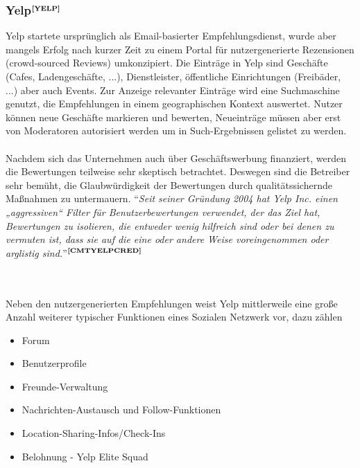 \subsubsection[Yelp]{Yelp$^{\textbf{\ref{YELP}}}$}%
\addtocounter{footnote}{1}
Yelp startete ursprünglich als Email-basierter Empfehlungsdienst, wurde aber mangels Erfolg nach kurzer Zeit zu einem Portal für nutzergenerierte Rezensionen (crowd-sourced Reviews) umkonzipiert.
Die Einträge in Yelp sind Geschäfte (Cafes, Ladengeschäfte, ...), Dienstleister, öffentliche Einrichtungen (Freibäder, ...) aber auch Events. Zur Anzeige relevanter Einträge wird eine Suchmaschine genutzt, die Empfehlungen in einem geographischen Kontext auswertet. Nutzer können neue Geschäfte markieren und bewerten, Neueinträge müssen aber erst von Moderatoren autorisiert werden um in Such-Ergebnissen gelistet zu werden.\\ \\
Nachdem sich das Unternehmen auch über Geschäftswerbung finanziert, werden die Bewertungen teilweise sehr skeptisch betrachtet. Deswegen sind die Betreiber sehr bemüht, die Glaubwürdigkeit der Bewertungen durch qualitätssichernde Maßnahmen zu untermauern. "`\textit{Seit seiner Gründung 2004 hat Yelp Inc. einen „aggressiven“ Filter für Benutzerbewertungen verwendet, der das Ziel hat, Bewertungen zu isolieren, die entweder wenig hilfreich sind oder bei denen zu vermuten ist, dass sie auf die eine oder andere Weise voreingenommen oder arglistig sind.}"'$^{\textbf{\ref{CMTYELPCRED}}}$%
\addtocounter{footnote}{1}%
\\ \\
Neben den nutzergenerierten Empfehlungen weist Yelp mittlerweile eine große Anzahl weiterer typischer Funktionen eines Sozialen Netzwerk vor, dazu zählen 
\begin{itemize}[leftmargin=*,noitemsep,topsep=1ex,parsep=0pt,partopsep=0pt]
\item Forum
\item Benutzerprofile
\item Freunde-Verwaltung
\item Nachrichten-Austausch und Follow-Funktionen
\item Location-Sharing-Infos/Check-Ins
\item Belohnung - Yelp Elite Squad
\end{itemize}

